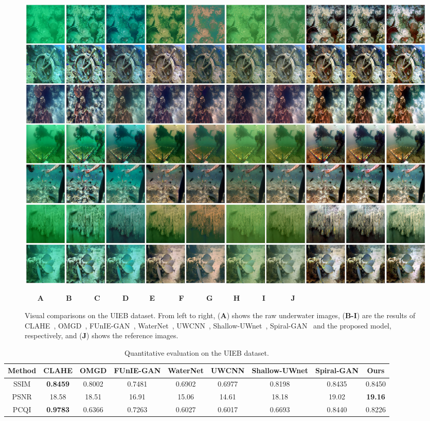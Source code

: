 \documentclass[utf8]{FrontiersinHarvard} %
\begin{document}
\begin{figure}[htbp]
\begin{center}
\includegraphics[width=1\textwidth]{FSpiralGAN_frontiers/onepicture/UIEB300.jpg}
\end{center}
$~~~~~~~~$\textbf{A}$~~~~~~~~~~~~~~$\textbf{B}$~~~~~~~~~~~~~~$\textbf{C}$~~~~~~~~~~~~~~$\textbf{D}$~~~~~~~~~~~~~$\textbf{E}$~~~~~~~~~~~~~~~$\textbf{F}$~~~~~~~~~~~~~~$\textbf{G}$~~~~~~~~~~~~~$\textbf{H}$~~~~~~~~~~~~~~$\textbf{I}$~~~~~~~~~~~~~~~~$\textbf{J}
 \caption{Visual comparisons on the UIEB dataset. From left to right, (\textbf{A}) shows the raw underwater images, (\textbf{B-I}) are the results of CLAHE~\citep{109340}, OMGD~\citep{ren2021online}, FUnIE-GAN~\citep{9001231}, WaterNet~\citep{8917818}, UWCNN~\citep{2019Underwater1}, Shallow-UWnet~\citep{naik2021shallow}, Spiral-GAN~\citep{2020Underwater} and the proposed model, respectively, and (\textbf{J}) shows the reference images.\label{fig:comparison-UIEBD}}
\end{figure}
\begin{table}[htbp]\normalsize
\centering
\setlength\tabcolsep{3pt}
\caption{{Quantitative evaluation on the UIEB dataset.}}
\begin{tabular}{c|cccccccc}
\hline  
Method&CLAHE&OMGD&FUnIE-GAN&WaterNet&UWCNN&Shallow-UWnet&Spiral-GAN&Ours\\
\hline 
SSIM&\textbf{0.8459}&0.8002&0.7481&0.6902&0.6977&0.8198&0.8435&0.8450\\
\hline 
PSNR&18.58&18.51&16.91&15.06&14.61&18.18&19.02&\textbf{19.16}\\
\hline
PCQI&\textbf{0.9783}&0.6366&0.7263&0.6027&0.6017&0.6693&0.8440&0.8226\\
\hline
\end{tabular}
\label{tbl:comparison-UIEBD}
\end{table}
\end{document}
